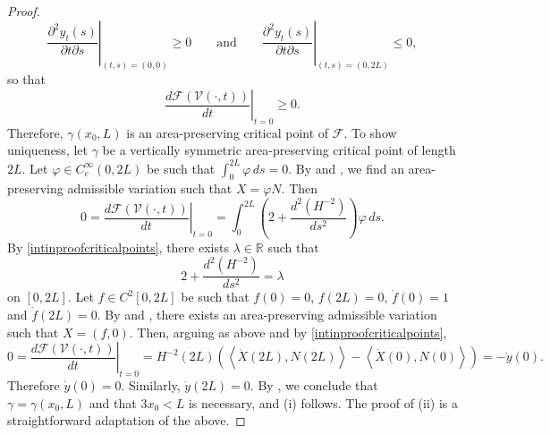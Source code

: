 \documentclass[11pt]{amsart}
\renewcommand{\leq}{\leqslant}
\renewcommand{\geq}{\geqslant}
\newcommand{\F}{\mathcal F}
\newcommand{\rr}{{\mathbb{R}}}
\newcommand{\ga}{\gamma}
\theoremstyle{definition}
\theoremstyle{remark}
\numberwithin{equation}{section}
\begin{document}
\begin{proof}
\begin{equation*}
	\left.\frac{\partial^2y_t(s)}{\partial t\partial s}\right|_{(t,s)=(0,0)}\geq 0\qquad\text{and}\qquad\left.\frac{\partial^2y_t(s)}{\partial t\partial s}\right|_{(t,s)=(0,2L)}\leq 0,
\end{equation*}
so that 
\begin{equation*}
	\left.\frac{d\F(\mathcal V(\cdot,t))}{dt}\right|_{t=0}\geq 0.
\end{equation*}
Therefore, $\gamma(x_0,L)$ is an area-preserving critical point of $\F$. To show uniqueness, let $\ga$ be a vertically symmetric area-preserving critical point of length $2L$. Let $\varphi\in C^\infty_c(0,2L)$ be such that $\int_0^{2L}\varphi\,ds=0$. By  and , we find an area-preserving admissible variation such that $X=\varphi N$. Then
\begin{equation}\label{intinproofcriticalpoints}
	0=  \left.\frac{d\F(\mathcal V(\cdot,t))}{dt}\right|_{t=0}=\int_0^{2L}\left(2+\frac{d^2(H^{-2})}{ds^2}\right)\varphi\,ds.
\end{equation}
By \eqref{intinproofcriticalpoints}, there exists $\lambda\in\rr$ such that
\begin{equation*}
	2+\frac{d^2(H^{-2})}{ds^2}=\lambda
\end{equation*}
on $[0,2L]$. Let $f\in C^2[0,2L]$ be such that $f(0)=0$, $f(2L)=0$, $\dot f(0)=1$ and $\dot f(2L)=0$. By  and , there exists an area-preserving admissible variation such that $X=(f,0)$. Then, arguing as above and by \eqref{intinproofcriticalpoints}, \begin{equation*}
	0=  \left.\frac{d\F(\mathcal V(\cdot,t))}{dt}\right|_{t=0}=H^{-2}(2L)\left(\left\langle\dot X(2L),N(2L)\right\rangle-\left\langle\dot X(0),N(0)\right\rangle\right)=-\dot y(0).
\end{equation*}
Therefore $\dot y(0)=0$. Similarly, $\dot y(2L)=0$. By , we conclude that $\gamma=\gamma(x_0,L)$ and that 
$3x_0<L$ is necessary, and (i) follows. The proof of (ii) is a straightforward adaptation of the above.
\end{proof}
\end{document}
